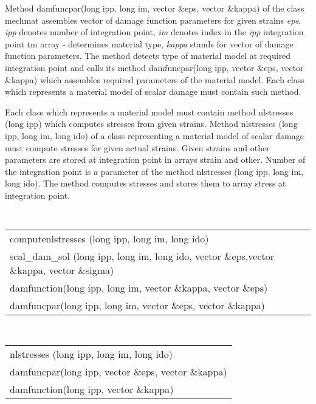 Method {\sf damfuncpar(long ipp, long im, vector \&eps, vector \&kappa)} of the class {\sf mechmat} assembles vector of
damage function parameters for given strains {\it eps}. {\it ipp} denotes number of integration point, {\it im} denotes index in the {\it ipp} 
integration point {\sf tm array} - determines material type, {\it kappa} stands for vector of damage function parameters. The method detects type 
of material model at required integration point and calls its method {\sf damfuncpar(long ipp, vector \&eps, vector \&kappa)} which assembles required 
parameters of the material model. Each class which represents a material model of scalar damage must contain such method.

Each class which represents a material model must contain method {\sf nlstresses (long ipp)} which computes
stresses from given strains.
Method {\sf nlstresses (long ipp, long im, long ido)} of a class representing a material model of scalar damage must compute
stresses for given actual strains. Given strains and other parameters are stored at integration point in arrays
{\sf strain} and {\sf other}. Number of the integration point is a parameter of the method {\sf nlstresses (long ipp, long im, long ido)}.
The method computes stresses and stores them to array {\sf stress} at integration point.

{\tt
\begin{tabular}{l}
computenlstresses (long ipp, long im, long ido)
\\
scal\_dam\_sol (long ipp, long im, long ido, vector \&eps,vector \&kappa, vector \&sigma)
\\
damfunction(long ipp, long im, vector \&kappa, vector \&eps)
\\
damfuncpar(long ipp, long im, vector \&eps, vector \&kappa)
\\
\end{tabular}
}

{\tt
\begin{tabular}{l}
nlstresses (long ipp, long im, long ido)
\\
damfuncpar(long ipp, vector \&eps, vector \&kappa)
\\
damfunction(long ipp, vector \&kappa)
\\
\end{tabular}
}
